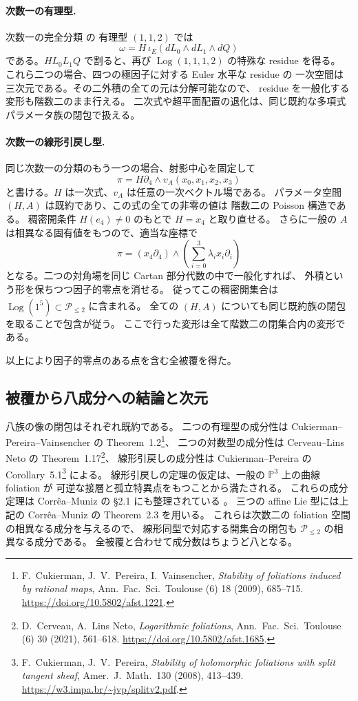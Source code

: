 \paragraph{次数一の有理型.}
次数一の完全分類 \cite[Theorem~6.2, Corollary~6.3]{LPT} の
有理型 $(1,1,2)$ では
\[
 \omega=H\,\iota_E(dL_0\wedge dL_1\wedge dQ)
\]
である。$H L_0L_1Q$ で割ると、再び
$\operatorname{Log}(1,1,1,2)$ の特殊な residue を得る。
これら二つの場合、四つの極因子に対する Euler 水平な residue の
一次空間は三次元である。その二外積の全ての元は分解可能なので、
residue を一般化する変形も階数二のまま行える。
二次式や超平面配置の退化は、同じ既約な多項式パラメータ族の閉包で扱える。

\paragraph{次数一の線形引戻し型.}
同じ次数一の分類のもう一つの場合、射影中心を固定して
\[
 \pi=H\partial_4\wedge v_A(x_0,x_1,x_2,x_3)
\]
と書ける。$H$ は一次式、$v_A$ は任意の一次ベクトル場である。
パラメータ空間 $(H,A)$ は既約であり、この式の全ての非零の値は
階数二の Poisson 構造である。
稠密開条件 $H(e_4)\ne0$ のもとで $H=x_4$ と取り直せる。
さらに一般の $A$ は相異なる固有値をもつので、適当な座標で
\[
 \pi=(x_4\partial_4)\wedge
       \left(\sum_{i=0}^{3}\lambda_i x_i\partial_i\right)
\]
となる。二つの対角場を同じ Cartan 部分代数の中で一般化すれば、
外積という形を保ちつつ因子的零点を消せる。
従ってこの稠密開集合は
$\overline{\operatorname{Log}(1^5)}\subset\mathcal P_{\leq2}$ に含まれる。
全ての $(H,A)$ についても同じ既約族の閉包を取ることで包含が従う。
ここで行った変形は全て階数二の閉集合内の変形である。

以上により因子的零点のある点を含む全被覆を得た。

\subsection{被覆から八成分への結論と次元}

八族の像の閉包はそれぞれ既約である。
二つの有理型の成分性は Cukierman--Pereira--Vainsencher の
Theorem~1.2\footnote{F.~Cukierman, J.~V.~Pereira, I.~Vainsencher,
\emph{Stability of foliations induced by rational maps},
Ann.~Fac.~Sci.~Toulouse (6) 18 (2009), 685--715.
\url{https://doi.org/10.5802/afst.1221}.}、
二つの対数型の成分性は Cerveau--Lins Neto の
Theorem~1.17\footnote{D.~Cerveau, A.~Lins Neto,
\emph{Logarithmic foliations}, Ann.~Fac.~Sci.~Toulouse (6) 30 (2021),
561--618. \url{https://doi.org/10.5802/afst.1685}.}、
線形引戻しの成分性は Cukierman--Pereira の
Corollary~5.1\footnote{F.~Cukierman, J.~V.~Pereira,
\emph{Stability of holomorphic foliations with split tangent sheaf},
Amer.~J.~Math.~130 (2008), 413--439.
\url{https://w3.impa.br/~jvp/splitv2.pdf}.} による。
線形引戻しの定理の仮定は、一般の $\mathbb P^3$ 上の曲線 foliation が
可逆な接層と孤立特異点をもつことから満たされる。
これらの成分定理は Corr\^ea--Muniz の \S2.1 にも整理されている
\cite[\S2.1]{CM}。
三つの affine Lie 型には上記の Corr\^ea--Muniz の Theorem~2.3 を用いる。
これらは次数二の foliation 空間の相異なる成分を与えるので、
線形同型で対応する開集合の閉包も $\mathcal P_{\leq2}$ の相異なる成分である。
全被覆と合わせて成分数はちょうど八となる。

